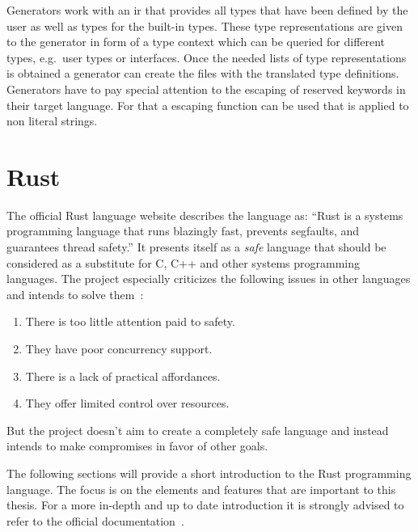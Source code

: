 \documentclass[thesis]{subfiles}
\begin{document}
    Generators work with an \gls{ir} that provides all types that have been defined by the user as well as types for the built-in types.
    These type representations are given to the generator in form of a type context which can be queried for different types, e.g.~user types or interfaces.
    Once the needed lists of type representations is obtained a generator can create the files with the translated type definitions.
    Generators have to pay special attention to the escaping of reserved keywords in their target language.
    For that a escaping function can be used that is applied to non literal strings.

\section{Rust}\label{sec:rust}
  The official Rust language website describes the language as:
  \enquote{Rust is a systems programming language that runs blazingly fast, prevents segfaults, and guarantees thread safety.}\autocite{rust-org}
  It presents itself as a \emph{safe} language that should be considered as a substitute for C, C++ and other systems programming languages.
  The project especially criticizes the following issues in other languages and intends to solve them~\autocite{rust-faq}:
  \begin{enumerate}
    \item There is too little attention paid to safety.
    \item They have poor concurrency support.
    \item There is a lack of practical affordances.
    \item They offer limited control over resources.
  \end{enumerate}
  But the project doesn't aim to create a completely safe language and instead intends to make compromises in favor of other goals.%
  ~\autocite{rust-faq}

  The following sections will provide a short introduction to the Rust programming language.
  The focus is on the elements and features that are important to this thesis.
  For a more in-depth and up to date introduction it is strongly advised to refer to the official documentation~\autocites{rust-org}{rust-doc}{rust-nom}{rust-book}.
\end{document}

